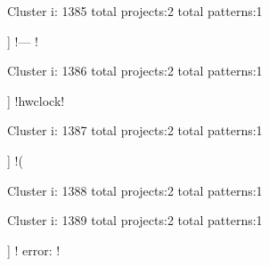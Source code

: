 Cluster i: 1385
total projects:2
total patterns:1
\begin{multicols}{1}
\begin{description}[noitemsep,topsep=0pt]
\item [[2] ] \cverb!--- \w!
\end{description}
\end{multicols}







Cluster i: 1386
total projects:2
total patterns:1
\begin{multicols}{1}
\begin{description}[noitemsep,topsep=0pt]
\item [[2] ] \cverb!hwclock!
\end{description}
\end{multicols}







Cluster i: 1387
total projects:2
total patterns:1
\begin{multicols}{1}
\begin{description}[noitemsep,topsep=0pt]
\item [[2] ] \cverb!(%
\end{description}
\end{multicols}







Cluster i: 1388
total projects:2
total patterns:1
\begin{multicols}{1}
\end{multicols}







Cluster i: 1389
total projects:2
total patterns:1
\begin{multicols}{1}
\begin{description}[noitemsep,topsep=0pt]
\item [[2] ] \cverb! error: !
\end{description}
\end{multicols}







